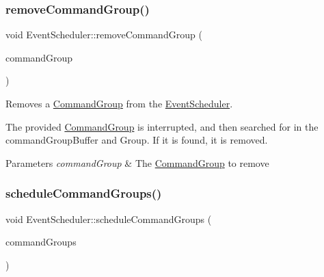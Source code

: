 \subsubsection{\texorpdfstring{removeCommandGroup()}{removeCommandGroup()}}
{\footnotesize\ttfamily void Event\+Scheduler\+::remove\+Command\+Group (\begin{DoxyParamCaption}\item[{\mbox{\hyperlink{classlib_iterative_robot_1_1_command_group}{Command\+Group}} $\ast$}]{command\+Group }\end{DoxyParamCaption})}



Removes a \mbox{\hyperlink{classlib_iterative_robot_1_1_command_group}{Command\+Group}} from the \mbox{\hyperlink{classlib_iterative_robot_1_1_event_scheduler}{Event\+Scheduler}}. 

The provided \mbox{\hyperlink{classlib_iterative_robot_1_1_command_group}{Command\+Group}} is interrupted, and then searched for in the command\+Group\+Buffer and Group. If it is found, it is removed.


\begin{DoxyParams}{Parameters}
{\em command\+Group} & The \mbox{\hyperlink{classlib_iterative_robot_1_1_command_group}{Command\+Group}} to remove \\
\hline
\end{DoxyParams}
\mbox{\label{classlib_iterative_robot_1_1_event_scheduler_aa516958158457164590a1d092891c05c}} 
\subsubsection{\texorpdfstring{scheduleCommandGroups()}{scheduleCommandGroups()}}
{\footnotesize\ttfamily void Event\+Scheduler\+::schedule\+Command\+Groups (\begin{DoxyParamCaption}\item[{std\+::vector$<$ \mbox{\hyperlink{classlib_iterative_robot_1_1_command_group}{Command\+Group}} $\ast$ $>$ $\ast$}]{command\+Groups }\end{DoxyParamCaption})\hspace{0.3cm}{\ttfamily [private]}}



